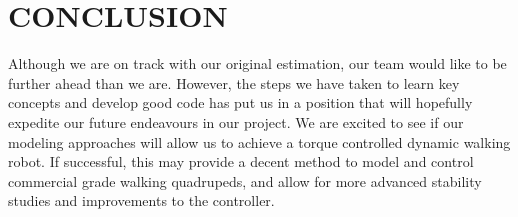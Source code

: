 \section{CONCLUSION}
Although we are on track with our original estimation, our team would like to be further ahead than we are. However, the steps we have taken to learn key concepts and develop good code has put us in a position that will hopefully expedite our future endeavours in our project. We are excited to see if our modeling approaches will allow us to achieve a torque controlled dynamic walking robot. If successful, this may provide a decent method to model and control commercial grade walking quadrupeds, and allow for more advanced stability studies and improvements to the controller.